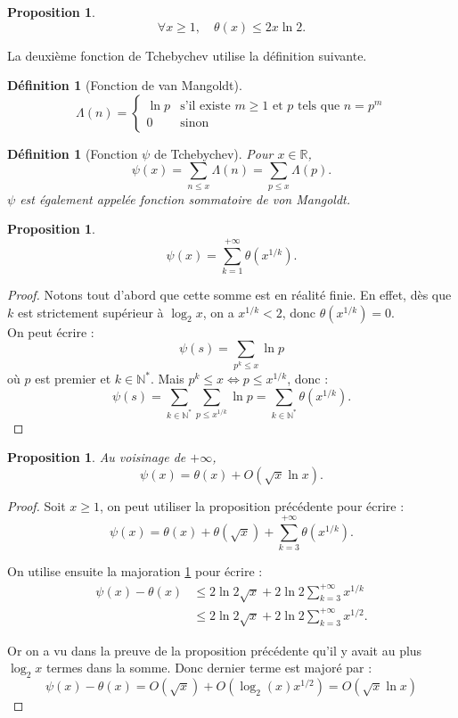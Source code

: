 \documentclass[french]{report}
\newtheorem{definition}[theorem]{Définition}
\newtheorem{proposition}[theorem]{Proposition}
\begin{document}
\begin{proposition}\label{prop:theta-majoration}
  \[
    \forall x\geq1,\quad \theta(x)\leq 2x\ln 2.
  \]
\end{proposition}

La deuxième fonction de Tchebychev utilise la définition suivante.

\begin{definition}[Fonction de van Mangoldt]
  \[
    \Lambda(n)=
    \begin{cases}
      \ln p & \text{s'il existe $m\geq1$ et $p$ tels que $n=p^m$} \\
      0 & \text{sinon}
    \end{cases}
  \]
\end{definition}

\begin{definition}[Fonction $\psi$ de Tchebychev] Pour $x\in \mathbb{R}$,
  \[
    \psi(x)
    = \sum_{n \le x}\Lambda (n)
    = \sum_{p \le x}\Lambda (p).
  \]
  $\psi$ est également appelée fonction sommatoire de von Mangoldt.
\end{definition}

\begin{proposition}
  \[
    \psi(x) = \sum_{k=1}^{+\infty}\theta(x^{1/k}).
  \]
\end{proposition}

\begin{proof}
  Notons tout d'abord que cette somme est en réalité finie. En effet, dès que $k$ est strictement supérieur à $\log_2 x$, on a $x^{1/k}<2$, donc $\theta(x^{1/k})=0$.
  \\

  On peut écrire :
  \[
    \psi(s) = \sum_{p^k\leq x}\ln p  
  \]
  où $p$ est premier et $k\in\mathbb{N}^*$. Mais $p^k\leq x\Leftrightarrow p\leq x^{1/k}$, donc :
  \[
    \psi(s)
    = \sum_{k\in\mathbb{N}^*}\sum_{p\leq x^{1/k}}\ln p 
    = \sum_{k\in\mathbb{N}^*}\theta(x^{1/k}).
  \]
\end{proof}

\begin{proposition}\label{prop:relation-psi-theta}
  Au voisinage de $+\infty$,
  \[
    \psi(x) = \theta(x) + O(\sqrt{x}\ln x).
  \]
\end{proposition}

\begin{proof}
  Soit $x\geq1$, on peut utiliser la proposition précédente pour écrire :
  \[
    \psi(x)
    = \theta(x) + \theta(\sqrt{x})
    + \sum_{k=3}^{+\infty}\theta(x^{1/k}).
  \]

  On utilise ensuite la majoration \ref{prop:theta-majoration} pour écrire :
  \begin{align*}
    \psi(x)-\theta(x)
    &\leq 2\ln2\sqrt{x}
    + 2\ln2\sum_{k=3}^{+\infty}x^{1/k} \\
    &\leq 2\ln2\sqrt{x}
    + 2\ln2\sum_{k=3}^{+\infty}x^{1/2}.
  \end{align*}

  Or on a vu dans la preuve de la proposition précédente qu'il y avait au plus $\log_2x$ termes dans la somme. Donc dernier terme est majoré par :
  \[
    \psi(x)-\theta(x)
    = O(\sqrt{x}) + O(\log_2(x)x^{1/2}) = O(\sqrt{x}\ln x)
  \]
\end{proof}
\end{document}
